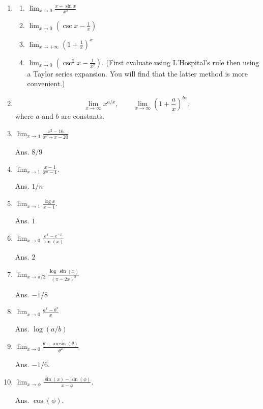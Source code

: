 \begin{enumerate}
\item
  \renewcommand{\theenumi}{\alph{enumi}}
  \begin{enumerate}
  \item
    $\lim_{x \to 0} \frac{x - \sin x}{x^3}$
  \item
    $\lim_{x \to 0} \left( \csc x - \frac{1}{x} \right)$
  \item
    $\lim_{x \to +\infty} \left( 1 + \frac{1}{x} \right)^x$
  \item
    $\lim_{x \to 0} \left( \csc^2 x - \frac{1}{x^2} \right)$.
    (First evaluate using L'Hospital's rule then using a Taylor series expansion.
    You will find that the latter method is more convenient.)
  \end{enumerate}


\item
  \[
  \lim_{x \to \infty} x^{a/x}, \qquad
  \lim_{x \to \infty} \left( 1 + \frac{a}{x} \right)^{b x},
  \]
  where $a$ and $b$ are constants.


\item
$\lim_{x \to 4}\frac{x^2-16}{x^2+x-20}$

Ans. $8/9$

\item
$\lim_{x \to 1}\frac{x-1}{x^n-1}$.

Ans. $1/n$

\item
$\lim_{x \to 1} \frac{\log x}{x-1}$.

Ans. $1$

\item
$\lim_{x \to 0} \frac{e^x-e^{-x}}{\sin(x)}$

Ans. $2$

\item
$\lim_{x \to \pi/2} \frac{\log\,\sin(x)}{(\pi-2x)^2}$

Ans. $-1/8$

\item
$\lim_{x \to 0} \frac{a^x-b^x}{x}$

Ans. $\log(a/b)$

\item
$\lim_{x \to 0} \frac{\theta -\arcsin(\theta)}{\theta^2}$

Ans. $-1/6$.

\item
$\lim_{x \to \phi} \frac{\sin(x)-\sin(\phi)}{x-\phi}$.

Ans. $\cos(\phi)$.



\end{enumerate}

